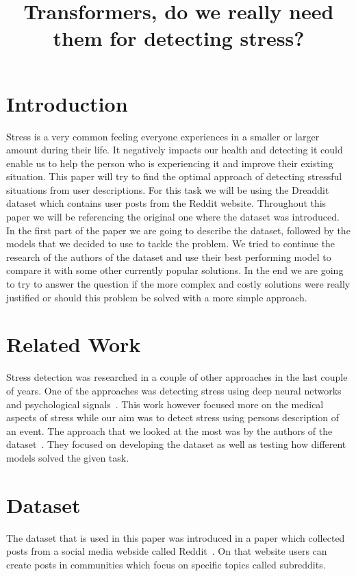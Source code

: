 \documentclass[10pt, a4paper]{article}
\title{Transformers, do we really need them for detecting stress?}
\begin{document}
\maketitleabstract

\section{Introduction}

Stress is a very common feeling everyone experiences in a smaller or larger amount during their life.
It negatively impacts our health and detecting it could enable us to help the person who is experiencing it and improve their existing situation.
This paper will try to find the optimal approach of detecting stressful situations from user descriptions.
For this task we will be using the Dreaddit dataset which contains user posts from the Reddit website.
Throughout this paper we will be referencing the original one where the dataset was introduced.
\hfill \break
\hfill \break
In the first part of the paper we are going to describe the dataset, followed by the models that we decided to use to tackle the problem.
We tried to continue the research of the authors of the dataset and use their best performing model to compare it with some other currently popular solutions.
In the end we are going to try to answer the question if the more complex and costly solutions were really justified or should this problem be solved with a more simple approach.

\section{Related Work}
Stress detection was researched in a couple of other approaches in the last couple of years.
One of the approaches was detecting stress using deep neural networks and psychological signals~\citep{stress-neural}.
This work however focused more on the medical aspects of stress while our aim was to detect stress using persons description of an event.
The approach that we looked at the most was by the authors of the dataset~\citep{turcan-mckeown-2019-dreaddit}.
They focused on developing the dataset as well as testing how different models solved the given task.

\section{Dataset}

The dataset that is used in this paper was introduced in a paper which collected posts from a social media webside called Reddit~\citep{turcan-mckeown-2019-dreaddit}.
On that website users can create posts in communities which focus on specific topics called subreddits.
\end{document}
